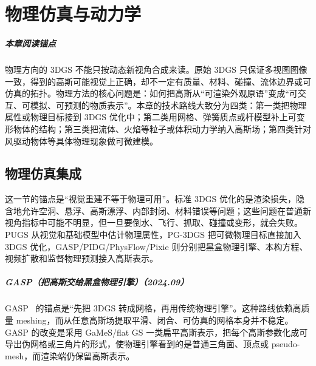 \chapter{物理仿真与动力学}

\paragraph*{本章阅读锚点}
物理方向的 3DGS 不能只按动态新视角合成来读。原始 3DGS 只保证多视图图像一致，得到的高斯可能视觉上正确，却不一定有质量、材料、碰撞、流体边界或可仿真的拓扑。物理方法的核心问题是：如何把高斯从“可渲染外观原语”变成“可交互、可模拟、可预测的物质表示”。本章的技术路线大致分为四类：第一类把物理属性或物理目标接到 3DGS 优化中；第二类用网格、弹簧质点或杆模型补上可变形物体的结构；第三类把流体、火焰等粒子或体积动力学纳入高斯场；第四类针对风驱动物体等具体物理现象做可微建模。

\section{物理仿真集成}

这一节的锚点是“视觉重建不等于物理可用”。标准 3DGS 优化的是渲染损失，隐含地允许空洞、悬浮、高斯漂浮、内部封闭、材料错误等问题；这些问题在普通新视角指标中可能不明显，但一旦要倒水、飞行、抓取、碰撞或变形，就会失败。PUGS 从视觉和基础模型中估计物理属性，PG-3DGS 把可微物理目标直接加入 3DGS 优化，GASP/PIDG/PhysFlow/Pixie 则分别把黑盒物理引擎、本构方程、视频扩散和监督物理预测接入高斯表示。



\paragraph{GASP（把高斯交给黑盒物理引擎）（2024.09）}
GASP~\cite{2409_05819} 的锚点是“先把 3DGS 转成网格，再用传统物理引擎”。这种路线依赖高质量 meshing，而从任意高斯场提取平滑、闭合、可仿真的网格本身并不稳定。GASP 的改变是采用 GaMeS/flat GS 一类扁平高斯表示，把每个高斯参数化成可导出伪网格或三角片的形式，使物理引擎看到的是普通三角面、顶点或 pseudo-mesh，而渲染端仍保留高斯表示。


